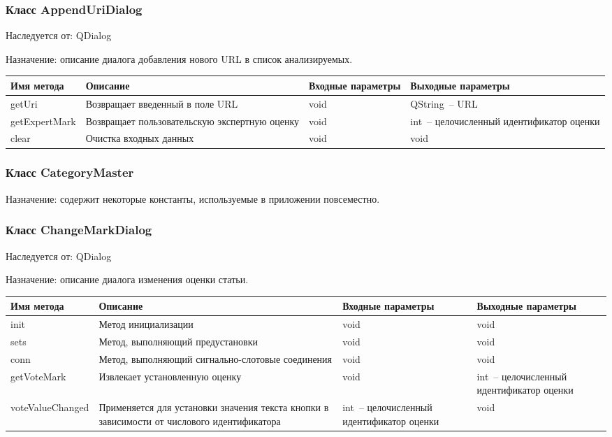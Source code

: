 \documentclass[a4paper,14pt,russian]{extreport}
\begin{document}
\subsubsection{Класс AppendUriDialog}

Наследуется от: QDialog

Назначение: описание диалога добавления нового URL в список анализируемых.

\begin{tabular}{|m{3 cm}|m{3 cm}|m{3 cm}|m{4 cm}|}
\hline 
Имя метода & Описание & Входные параметры & Выходные параметры \\
\hline
getUri & Возвращает введенный в поле URL & void & QString~-- URL \\
\hline
getExpertMark & Возвращает пользовательскую экспертную оценку & void & int~-- целочисленный идентификатор оценки \\
\hline
clear & Очистка входных данных & void & void \\
\hline 
\end{tabular}

\subsubsection{Класс CategoryMaster}

Назначение: содержит некоторые константы, используемые в приложении повсеместно.

\subsubsection{Класс ChangeMarkDialog}

Наследуется от: QDialog

Назначение: описание диалога изменения оценки статьи.

\begin{tabular}{|m{3 cm}|m{3 cm}|m{3 cm}|m{4 cm}|}
\hline
Имя метода & Описание & Входные параметры & Выходные параметры \\
\hline
init & Метод инициализации & void & void \\
\hline
sets & Метод, выполняющий предустановки & void & void \\
\hline
conn & Метод, выполняющий сигнально-слотовые соединения & void & void \\
\hline
getVoteMark & Извлекает установленную оценку & void & int~-- целочисленный идентификатор оценки \\
\hline
{voteValue\-Changed} & Применяется для установки значения текста кнопки в зависимости от числового идентификатора & int~-- целочисленный идентификатор оценки & void \\
\hline
\end{tabular}
\end{document}

